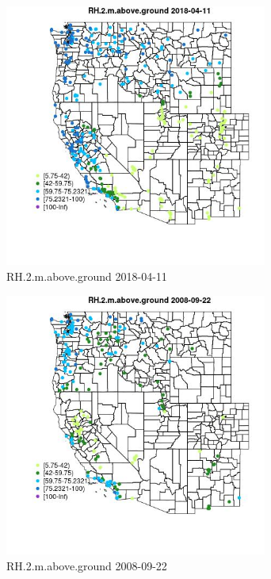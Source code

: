 \begin{figure} 
\centering  
\includegraphics[width=0.77\textwidth]{Code_Outputs/Report_ML_input_PM25_Step4_part_e_de_duplicated_aves_compiled_2019-05-18wNAs_MapObsRH2maboveground2018-04-11.jpg} 
\caption{\label{fig:Report_ML_input_PM25_Step4_part_e_de_duplicated_aves_compiled_2019-05-18wNAsMapObsRH2maboveground2018-04-11}RH.2.m.above.ground 2018-04-11} 
\end{figure} 
 

\begin{figure} 
\centering  
\includegraphics[width=0.77\textwidth]{Code_Outputs/Report_ML_input_PM25_Step4_part_e_de_duplicated_aves_compiled_2019-05-18wNAs_MapObsRH2maboveground2008-09-22.jpg} 
\caption{\label{fig:Report_ML_input_PM25_Step4_part_e_de_duplicated_aves_compiled_2019-05-18wNAsMapObsRH2maboveground2008-09-22}RH.2.m.above.ground 2008-09-22} 
\end{figure} 
 


